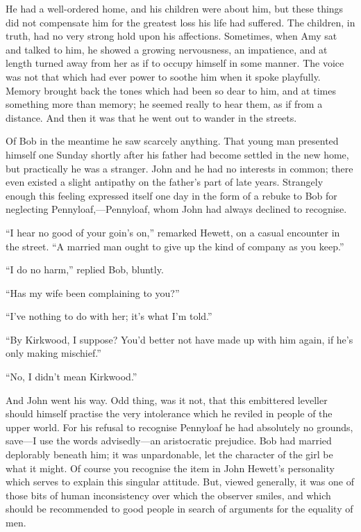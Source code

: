 He had a well-ordered home, and his children were about him, but these
things did not compensate him for the greatest loss his life
{\protect\hypertarget{219}{}{}}had suffered. The children, in truth, had
no very strong hold upon his affections. Sometimes, when Amy sat and
talked to him, he showed a growing nervousness, an impatience, and at
length turned away from her as if to occupy himself in some manner. The
voice was not that which had ever power to soothe him when it spoke
playfully. Memory brought back the tones which had been so dear to him,
and at times something more than memory; he seemed really to hear them,
as if from a distance. And then it was that he went out to wander in the
streets.

Of Bob in the meantime he saw scarcely anything. That young man
presented himself one Sunday shortly after his father had become settled
in the new home, but practically he was a stranger. John and he had no
interests in common; there even existed a slight antipathy on the
father's part of late years. Strangely enough this feeling expressed
itself one day in the form of a rebuke to Bob for neglecting
Pennyloaf,---Pennyloaf, whom John had always declined to recognise.

{\protect\hypertarget{220}{}{}}``I hear no good of your goin's on,''
remarked Hewett, on a casual encounter in the street. ``A married man
ought to give up the kind of company as you keep.''

``I do no harm,'' replied Bob, bluntly.

``Has my wife been complaining to you?''

``I've nothing to do with her; it's what I'm told.''

``By Kirkwood, I suppose? You'd better not have made up with him again,
if he's only making mischief.''

``No, I didn't mean Kirkwood.''

And John went his way. Odd thing, was it not, that this embittered
leveller should himself practise the very intolerance which he reviled
in people of the upper world. For his refusal to recognise Pennyloaf he
had absolutely no grounds, save---I use the words advisedly---an
aristocratic prejudice. Bob had married deplorably beneath him; it was
unpardonable, let the character of the girl be what it might. Of course
you recognise the item in John Hewett's personality which serves to
explain this singular attitude. But, viewed
{\protect\hypertarget{221}{}{}}generally, it was one of those bits of
human inconsistency over which the observer smiles, and which should be
recommended to good people in search of arguments for the equality of
men.

